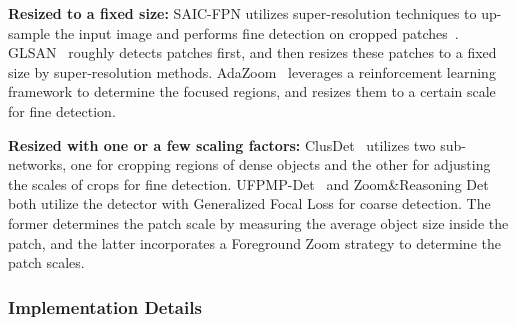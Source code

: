 \documentclass[letterpaper]{article} %
\newcommand\rjf[1]{\textcolor{red}{\{RJF: #1\}}}
\begin{document}
\sloppy \noindent \textbf{Resized to a fixed size:} 
SAIC-FPN utilizes super-resolution techniques to up-sample the input image and performs fine detection on cropped patches~\cite{Zhou_2019_SAICFPN}. GLSAN~\cite{Deng_2021_GLSAN} roughly detects patches first, and then resizes these patches to a fixed size by super-resolution methods. 
AdaZoom~\cite{Xu_2022_AdaZoom} leverages a reinforcement learning framework to determine the focused regions, and resizes them to a certain scale for fine detection. 

\sloppy \noindent \textbf{Resized with one or a few scaling factors:} 
ClusDet~\cite{Yang_2019_Clustered} utilizes two sub-networks, one for cropping regions of dense objects and the other for adjusting the scales of crops for fine detection. 
UFPMP-Det~\cite{Huang_2022_UFPMP} and Zoom\&Reasoning Det~\cite{Ge_2022_ZoomAndReasoning} both utilize the detector with Generalized Focal Loss \cite{Li_2020_GFL} for coarse detection. 
The former determines the patch scale by measuring the average object size inside the patch, and the latter incorporates a Foreground Zoom strategy to determine the patch scales. 




\subsubsection{Implementation Details}
\label{sssec:implementationDetails}
\end{document}
